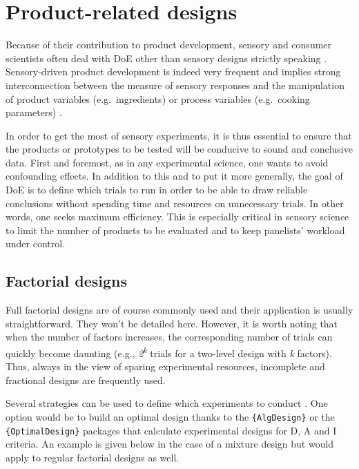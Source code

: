 \documentclass[
]{krantz}
\begin{document}
\hypertarget{product-related-designs}{%
\section{Product-related designs}\label{product-related-designs}}

Because of their contribution to product development, sensory and consumer scientists often deal with DoE other than sensory designs strictly speaking \citep[see for instance][]{gacula2008design}. Sensory-driven product development is indeed very frequent and implies strong interconnection between the measure of sensory responses and the manipulation of product variables (e.g.~ingredients) or process variables (e.g.~cooking parameters) \citep[for a review, see][]{Yu2018}.

In order to get the most of sensory experiments, it is thus essential to ensure that the products or prototypes to be tested will be conducive to sound and conclusive data. First and foremost, as in any experimental science, one wants to avoid confounding effects. In addition to this and to put it more generally, the goal of DoE is to define which trials to run in order to be able to draw reliable conclusions without spending time and resources on unnecessary trials. In other words, one seeks maximum efficiency. This is especially critical in sensory science to limit the number of products to be evaluated and to keep panelists' workload under control.

\hypertarget{factorial-designs}{%
\subsection{Factorial designs}\label{factorial-designs}}

Full factorial designs are of course commonly used and their application is usually straightforward. They won't be detailed here. However, it is worth noting that when the number of factors increases, the corresponding number of trials can quickly become daunting (e.g., \emph{2\textsuperscript{k}} trials for a two-level design with \emph{k} factors). Thus, always in the view of sparing experimental resources, incomplete and fractional designs are frequently used.

Several strategies can be used to define which experiments to conduct \citep[\citet{Lawson2014}, \citet{Rasch2011}]{Dean2017}. One option would be to build an optimal design thanks to the \texttt{\{AlgDesign\}} or the \texttt{\{OptimalDesign\}} packages that calculate experimental designs for D, A and I criteria. An example is given below in the case of a mixture design but would apply to regular factorial designs as well.
\end{document}
